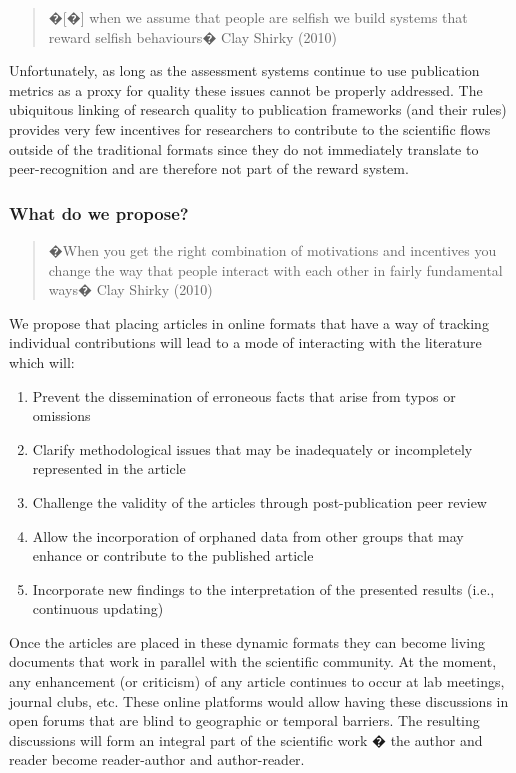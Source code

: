 \documentclass[final,authoryear,3p]{elsarticle-open-drafting}
\begin{document}
\begin{quote}
�[�] when we assume that people are selfish we build systems that reward selfish behaviours� Clay Shirky (2010)
\end{quote}

Unfortunately, as long as the assessment systems continue to use publication metrics as a proxy for quality these issues cannot be properly addressed. The ubiquitous linking of research quality to publication frameworks (and their rules) provides very few incentives for researchers to contribute to the scientific flows outside of the traditional formats since they do not immediately translate to peer-recognition and are therefore not part of the reward system. 

\subsubsection{What do we propose?}

\begin{quote}
�When you get the right combination of motivations and incentives you change the way that people interact with each other in fairly fundamental ways� Clay Shirky (2010)
\end{quote}

We propose that placing articles in online formats that have a way of tracking individual contributions will lead to a mode of interacting with the literature which will:

\begin{enumerate}
	\item Prevent the dissemination of erroneous facts that arise from typos or omissions
	\item Clarify methodological issues that may be inadequately or incompletely represented in the article
	\item Challenge the validity of the articles through post-publication peer review
	\item Allow the incorporation of orphaned data from other groups that may enhance or contribute to the published article
	\item Incorporate new findings to the interpretation of the presented results (i.e., continuous updating)
\end{enumerate}

Once the articles are placed in these dynamic formats they can become living documents that work in parallel with the scientific community. At the moment, any enhancement (or criticism) of any article continues to occur at lab meetings, journal clubs, etc. These online platforms would allow having these discussions in open forums that are blind to geographic or temporal barriers. The resulting discussions will form an integral part of the scientific work � the author and reader become reader-author and author-reader.
\end{document}
